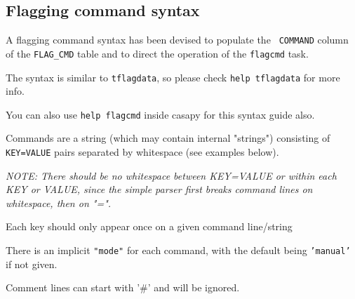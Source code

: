 \subsection{Flagging command syntax}
\label{section:edit.flagcmd.syntax}

A flagging command syntax has been devised to populate the {\tt
COMMAND} column of the {\tt FLAG\_CMD} table and to direct the 
operation of the {\tt flagcmd} task.

The syntax is similar to {\tt tflagdata}, so please check {\tt help
  tflagdata} for more info. 

You can also use {\tt help flagcmd} inside casapy for this syntax guide also.

Commands are a string (which may contain internal "strings")
consisting of {\tt KEY=VALUE} pairs separated by whitespace (see examples
below).

{\it NOTE: There should be no whitespace between KEY=VALUE or within each
KEY or VALUE, since the simple parser first breaks command lines on
whitespace, then on "=".}
        
Each key should only appear once on a given command line/string
        
There is an implicit {\tt "mode"} for each command, with the default being
{\tt 'manual'} if not given.

Comment lines can start with '\#' and will be ignored.
     

